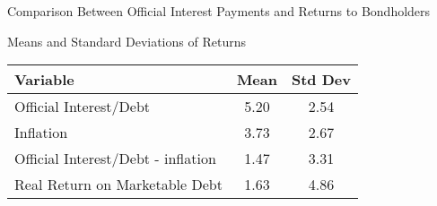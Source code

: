 \documentclass[professionalfonts,small]{beamer}
\begin{document}
\begin{frame}
\centerline{}
\vspace{.1in}
\centerline{Comparison Between Official Interest Payments and Returns to Bondholders}
\end{frame}



\begin{frame}{Means and Standard Deviations of Returns}

\begin{center}
\begin{tabular}{lcc}
Variable                          &  Mean    & Std Dev \\
\hline
Official Interest/Debt               &   5.20   &    2.54 \\
Inflation                            &   3.73   &    2.67 \\
Official Interest/Debt - inflation   &   1.47   &    3.31 \\
Real Return on Marketable Debt       &   1.63   &    4.86 \\
\end{tabular}
\end{center}

\end{frame}
\end{document}

